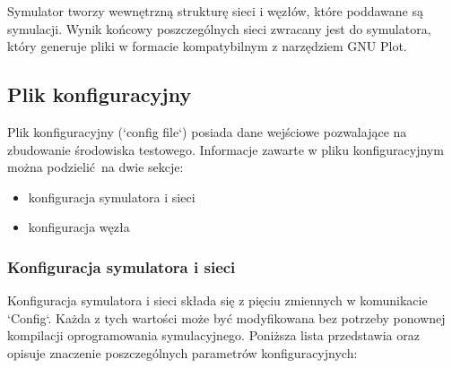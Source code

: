 \documentclass[a4paper,12pt,twoside,openany]{report}
\begin{document}
Symulator tworzy wewnętrzną strukturę sieci i węzłów, które poddawane są symulacji. Wynik końcowy poszczególnych sieci zwracany jest do symulatora, który
generuje pliki w formacie kompatybilnym z narzędziem GNU Plot. 

\subsection{Plik konfiguracyjny}

Plik konfiguracyjny (`config file`) posiada dane wejściowe pozwalające na zbudowanie środowiska testowego. 
Informacje zawarte w pliku konfiguracyjnym można podzielić na dwie sekcje:

\begin{itemize}
 \item konfiguracja symulatora i sieci
 \item konfiguracja węzła
\end{itemize}

\subsubsection{Konfiguracja symulatora i sieci}

Konfiguracja symulatora i sieci składa się z pięciu zmiennych w komunikacie `Config`. Każda z tych wartości może być modyfikowana bez potrzeby
ponownej kompilacji oprogramowania symulacyjnego. Poniższa lista przedstawia oraz opisuje znaczenie poszczególnych parametrów konfiguracyjnych:
\end{document}
